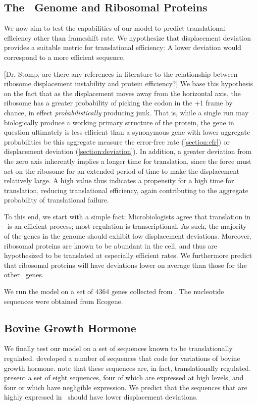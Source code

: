 \documentclass[12pt, draft]{article}
\numberwithin{equation}{section}
\begin{document}
\subsection{The \ecoli\ Genome and Ribosomal Proteins}
We now aim to test the capabilities of our model to predict translational
efficiency other than frameshift rate.  We hypothesize that displacement
deviation provides a suitable metric for translational efficiency:  A lower
deviation would correspond to a more efficient sequence.  

[Dr. Stomp, are there any references in literature to the relationship
  between ribosome displacement instability and protein efficiency?]
We base this hypothesis on the fact that as the displacement moves
away from the horizontal axis, the ribosome has a greater probability
of picking the codon in the +1 frame by chance, in effect
\emph{probabilistically} producing junk. That is, while a single run
may biologically produce a working primary structure of the protein,
the gene in question ultimately is less efficient than a synonymous gene
with lower aggregate probabilities be this aggregate measure the
error-free rate (\autoref{section:efr}) or displacement deviation
(\autoref{section:deviation}). In addition, a greater deviation from
the zero axis inherently implies a longer time for translation, since
the force must act on the ribosome for an extended period of time to
make the displacement relatively large.  A high value thus
indicates a propensity for a high time for translation, reducing
translational efficiency, again contributing to the aggregate
probability of translational failure.

To this end, we start with a simple fact:
Microbiologists agree that translation in \ecoli\ is an efficient process;
most regulation is transcriptional.  As such, the majority of the genes 
in the genome should exhibit low displacement deviations.  Moreover,
ribosomal proteins are known to be abundant in the cell, and thus
are hypothesized to be translated at especially efficient rates.  We
furthermore predict that ribosomal proteins will have deviations lower
on average than those for the other \ecoli\ genes.

We run the model on a set of 4364 genes collected from \ecoli.  The
nucleotide sequences were obtained from Ecogene.

\subsection{Bovine Growth Hormone}
We finally test our model on a set of sequences known to be translationally 
regulated.  \citet{schoner:bgh} developed a number of sequences that
code for variations of bovine growth hormone. \citeauthor{schoner:bgh}
note that these sequences are, in fact, translationally regulated.
\citeauthor{schoner:bgh} present a set of eight sequences, four of which
are expressed at high levels, and four or which have negligible expression.
We predict that the sequences that are highly expressed in
\ecoli\ should have lower displacement deviations.
\end{document}
